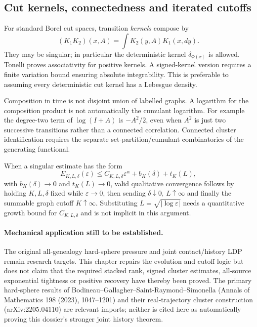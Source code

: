 \subsection{Cut kernels, connectedness and iterated cutoffs}
For standard Borel cut spaces, transition \emph{kernels} compose by
\[
 (K_1K_2)(x,A)=\int K_2(y,A)K_1(x,dy).
\]
They may be singular; in particular the deterministic kernel $\delta_{\Phi(x)}$ is allowed. Tonelli proves associativity for positive kernels. A signed-kernel version requires a finite variation bound ensuring absolute integrability. This is preferable to assuming every deterministic cut kernel has a Lebesgue density.

Composition in time is not disjoint union of labelled graphs. A logarithm for the composition product is not automatically the cumulant logarithm. For example the degree-two term of $\log(I+A)$ is $-A^2/2$, even when $A^2$ is just two successive transitions rather than a connected correlation. Connected cluster identification requires the separate set-partition/cumulant combinatorics of the generating functional.

When a singular estimate has the form
\[
 E_{K,L,\delta}(\varepsilon)\le C_{K,L,\delta}\varepsilon^\alpha
       +b_K(\delta)+t_K(L),
\]
with $b_K(\delta)\to0$ and $t_K(L)\to0$, valid qualitative convergence follows by holding $K,L,\delta$ fixed while $\varepsilon\to0$, then sending $\delta\downarrow0$, $L\uparrow\infty$ and finally the summable graph cutoff $K\uparrow\infty$. Substituting $L=\sqrt{|\log\varepsilon|}$ needs a quantitative growth bound for $C_{K,L,\delta}$ and is not implicit in this argument.

\paragraph{Mechanical application still to be established.}
The original all-genealogy hard-sphere pressure and joint contact/history LDP remain research targets. This chapter repairs the evolution and cutoff logic but does not claim that the required stacked rank, signed cluster estimates, all-source exponential tightness or positive recovery have thereby been proved. The primary hard-sphere results of Bodineau--Gallagher--Saint-Raymond--Simonella (Annals of Mathematics 198 (2023), 1047--1201) and their real-trajectory cluster construction (arXiv:2205.04110) are relevant imports; neither is cited here as automatically proving this dossier's stronger joint history theorem.
